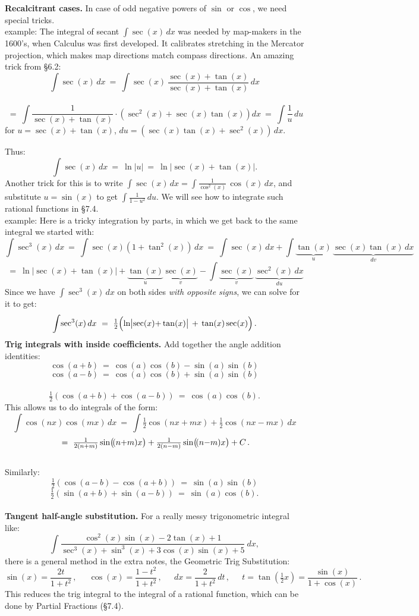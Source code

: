 \documentclass[11pt]{article}
\begin{document}
\noindent
{\bf Recalcitrant cases.} In case of odd negative powers of $\sin$ or $\cos$, 
we need special tricks.
\\[.5em]
{\sc example:} 
The integral of secant $\int \sec(x)\,dx$ was needed by map-makers in the 1600's, 
when Calculus was first developed. It calibrates stretching in the Mercator projection, 
which makes map directions match compass directions.
An amazing trick from \S6.2:
$$
\int\! \sec(x)\,dx
\ = \
\int\! \sec(x)\,
\frac{\sec(x)+\tan(x)}{\sec(x)+\tan(x)}
\,dx
$$
\\[-2em]
$$
\ = \
\int\! 
\frac{1}{\sec(x)+\tan(x)}\cdot\left(\sec^2(x)+\sec(x)\tan(x)\right)dx
\ =\
\int\! \frac{1}{u}\,du
$$
for $u=\sec(x)+\tan(x)$, 
$du=(\sec(x)\tan(x)+\sec^2(x))\,dx$.

\pagebreak

\noindent
Thus:
$$
\int \sec(x)\,dx \  =\ \ln\!|u|
\ =\ 
\ln|\!\sec(x){+}\tan(x)|.
$$
Another trick for this is to write $\int\! \sec(x)\,dx =\int \frac{1}{\cos^2(x)}\,\cos(x)\,dx$, and substitute $u=\sin(x)$ to get $\int\!\! \frac{1}{1-u^2}\,du$.
We will see how to integrate such rational functions in \S7.4.
\\[.5em]
{\sc example:} Here is a tricky integration by parts, in which we get back to the same integral we started with:
$$
\int\!\sec^3(x)\,dx
\ =\ 
\int\!\sec(x)(1+\tan^2(x))\,dx
\ =\ 
\int\! \sec(x)\,dx 
+ \int\! \underbrace{\tan(x)}_u\,\underbrace{\sec(x)\tan(x)\,dx}_{dv}
$$
$$
\ =\ \ln\!|\!\sec(x){+}\tan(x)| 
+ \underbrace{\tan(x)}_u\underbrace{\sec(x)}_v
- \int\! \underbrace{\sec(x)}_v\,\underbrace{\sec^2(x)\,dx}_{du}
$$
Since we have $\int\!\sec^3(x)\,dx$ on both sides
{\it with opposite signs}, we can solve for it to get:
$$
\int\!\sec^3(x)\,dx
\ =\ 
\tfrac12\!\left(\!\vphantom{\sum}
\ln\!\left|\vphantom{x^2}\!\sec(x){+}\tan(x)\right| 
\,+\,\tan(x)\sec(x)
\right).
$$
{\bf Trig integrals with inside coefficients.} Add together the angle addition identities:
$$
\cos(a{+}b)  \ = \ \cos(a)\cos(b) - \sin(a)\sin(b)
$$
$$
\cos(a{-}b) \ = \  \cos(a)\cos(b) + \sin(a)\sin(b)
$$
\\[-2em]
$$
\tfrac12(\cos(a{+}b) + \cos(a{-}b)) \ = \  \cos(a)\cos(b).
$$
This allows us to do integrals of the form:
$$
\int \cos(nx)\cos(mx)\,dx
\ =\
\int \tfrac12\cos(nx{+}mx) + \tfrac12\cos(nx{-}mx)\ dx
$$
$$
\ =\ \tfrac{1}{2(n{+}m)}\sin\!\left(\!\vphantom{A^2}(n{+}m)x\right)
+ \tfrac{1}{2(n{-}m)}\sin\!\left(\!\vphantom{A^2}(n{-}m)x\right)+C\,.
$$
\\[-.7em]
Similarly:
$$
\tfrac12(\cos(a{-}b) - \cos(a{+}b)) \ = \  \sin(a)\sin(b)
$$
$$
\tfrac12(\sin(a{+}b) + \sin(a{-}b)) \ = \  \sin(a)\cos(b).
$$
\\[0em]
{\bf Tangent half-angle substitution.} For a really messy trigonometric integral
like:
$$
\int \!\!\frac{\cos^2(x)\sin(x)-2\tan(x)+1}{\sec^3(x)+\sin^3(x)+3\cos(x)\sin(x)+5}\ dx,
$$
there is a general method in the extra notes,
the Geometric Trig Substitution:
$$
\sin(x) =  \frac{2t}{1+t^2}\,,
\quad \ \ 
\cos(x) = \frac{1-t^2}{1+t^2}\,, 
\quad \ \ 
dx = \frac{2}{1+t^2}\,dt\,,
\quad \ \ 
t =\tan(\tfrac12 x) = \frac{\sin(x)}{1+\cos(x)}\,.
$$ 
This reduces the trig integral to the integral of a rational function, 
which can be done by Partial Fractions (\S7.4).
\end{document}
